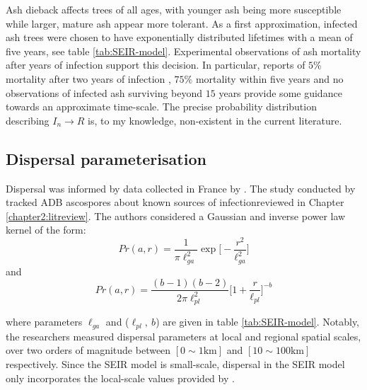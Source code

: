 Ash dieback affects trees of all ages, with younger ash being more susceptible while larger, mature ash appear more tolerant. 
As a first approximation, infected ash trees were chosen to have exponentially distributed lifetimes with a mean of five years, see table \ref{tab:SEIR-model}.
Experimental observations of ash mortality after years of infection support this decision. 
In particular, reports of $5\%$ mortality after two years of infection \cite{kessler2012dieback}, $75\%$ mortality within five years \cite{langer2015ash}  %
and no observations of infected ash surviving beyond $15$ years \cite{wylder2018evidence} provide some guidance towards an approximate time-scale.
The precise probability distribution describing $I_{n}\rightarrow R$ is, to my knowledge, non-existent in the current literature.

\subsection{Dispersal parameterisation}

Dispersal was informed by data collected in France by \cite{grosdidier2018tracking}.
The study conducted by \cite{grosdidier2018tracking} tracked ADB ascospores about known sources of infection\textemdash reviewed in Chapter \ref{chapter2:litreview}.
The authors considered a Gaussian and inverse power law kernel of the form:
\begin{equation}
    Pr(a, r) = \frac{1}{\pi \ell_{ga}^2} \exp\big[-\frac{r^2}{\ell_{ga}^2}\big]
\end{equation}
and
\begin{equation}
    Pr(a, r) = \frac{(b-1)(b-2)}{2\pi \ell_{pl}^2} \big[ 1+ \frac{r}{\ell_{pl}}\big]^{-b}
\end{equation}

where parameters $\ell_{ga}$ and ($\ell_{pl},\ b$) are given in table \ref{tab:SEIR-model}.
Notably, the researchers measured dispersal parameters at local and regional spatial scales, over two orders of magnitude between $[0 \sim 1\mathrm{km}]$ and $[10 \sim 100 \mathrm{km}]$ respectively.
Since the SEIR model is small-scale, dispersal in the SEIR model only incorporates the local-scale values provided by \cite{grosdidier2018tracking}.

